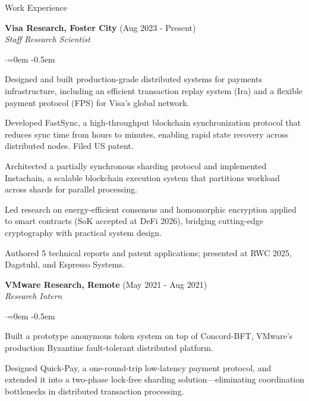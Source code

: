 \documentclass{resume}
\begin{document}
\begin{rSection}{Work Experience}
\label{sec:org55d8e7b}

\textbf{Visa Research, Foster City}  \hfill  (Aug 2023 - Present)\\
\emph{Staff Research Scientist}
\begin{list}{$\cdot$}{\leftmargin=0em}
\itemsep -0.5em \vspace{-0.5em}
 \item  Designed and built production-grade distributed systems for payments infrastructure, including an efficient transaction replay system (Ira) and a flexible payment protocol (FPS) for Visa's global network.
 \item  Developed FastSync, a high-throughput blockchain synchronization protocol that reduces sync time from hours to minutes, enabling rapid state recovery across distributed nodes. Filed US patent.
 \item  Architected a partially synchronous sharding protocol and implemented Instachain, a scalable blockchain execution system that partitions workload across shards for parallel processing.
 \item  Led research on energy-efficient consensus and homomorphic encryption applied to smart contracts (SoK accepted at DeFi 2026), bridging cutting-edge cryptography with practical system design.
 \item  Authored 5 technical reports and patent applications; presented at RWC 2025, Dagstuhl, and Espresso Systems.
\end{list}
\vspace{0.5em}

\textbf{VMware Research, Remote}  \hfill  (May 2021 - Aug 2021)\\
\emph{Research Intern}
\begin{list}{$\cdot$}{\leftmargin=0em}
\itemsep -0.5em \vspace{-0.5em}
 \item  Built a prototype anonymous token system on top of Concord-BFT, VMware's production Byzantine fault-tolerant distributed platform.
 \item  Designed Quick-Pay, a one-round-trip low-latency payment protocol, and extended it into a two-phase lock-free sharding solution---eliminating coordination bottlenecks in distributed transaction processing.
\end{list}
\vspace{0.5em}


\end{rSection}
\end{document}
